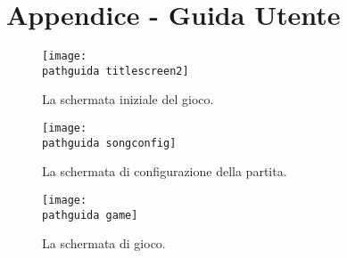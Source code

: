 \documentclass[a4paper,12pt]{report}
\newcommand\pathguida{img/guidautente/}
\begin{document}
\chapter{Appendice - Guida Utente}
\begin{figure}[!htb]
	\centerline{\texttt{[image: \\pathguida titlescreen2]}}
	\caption{La schermata iniziale del gioco.}
	\label{img:title}
\end{figure}
\begin{figure}[!htb]
	\centerline{\texttt{[image: \\pathguida songconfig]}}
	\caption{La schermata di configurazione della partita.}
	\label{img:select}
\end{figure}
\begin{figure}[!htb]
	\centerline{\texttt{[image: \\pathguida game]}}
	\caption{La schermata di gioco.}
	\label{img:game}
\end{figure}
\end{document}
